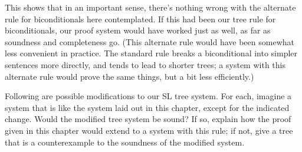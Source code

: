 This shows that in an important sense, there's nothing wrong with the alternate rule for biconditionals here contemplated. If this had been our tree rule for biconditionals, our proof system would have worked just as well, as far as soundness and completeness go. (This alternate rule would have been somewhat less convenient in practice. The standard rule breaks a biconditional into simpler sentences more directly, and tends to lead to shorter trees; a system with this alternate rule would prove the same things, but a bit less efficiently.)

\practiceproblems

\solutions
\problempart
\label{pr.SL.soundness-resolutions}
Following are possible modifications to our SL tree system. For each, imagine a system that is like the system laid out in this chapter, except for the indicated change. Would the modified tree system be sound? If so, explain how the proof given in this chapter would extend to a system with this rule; if not, give a tree that is a counterexample to the soundness of the modified system.
